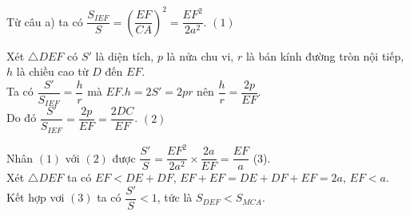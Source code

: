 \begin{bt}
{\begin{itemize}
			Từ câu a) ta có $\dfrac{S_{IEF}}{S}=(\dfrac{EF}{CA})^2=\dfrac{EF^2}{2a^2}$. \hspace{\fill} $(1)$\smallskip
			
			Xét $\triangle DEF$ có $S'$ là diện tích, $p$ là nửa chu vi, $r$ là bán kính đường tròn nội tiếp, $h$ là chiều cao từ $D$ đến $EF$.\\
			Ta có $\dfrac{S'}{S_{IEF}}=\dfrac{h}{r}$ mà $EF.h=2S'=2pr$ nên $\dfrac{h}{r}=\dfrac{2p}{EF}$.\\
			Do đó $\dfrac{S'}{S_{IEF}}=\dfrac{2p}{EF}=\dfrac{2DC}{EF}$. \hspace{\fill} $(2)$\smallskip
			
			Nhân $(1)$ với $(2)$ được $\dfrac{S'}{S}=\dfrac{EF^2}{2a^2}\times \dfrac{2a}{EF}=\dfrac{EF}{a}$ \hspace{\fill} (3).\\
			Xét $\triangle DEF$ ta có $EF<DE+DF$, $EF+EF=DE+DF+EF=2a$, $EF<a$.\\
			Kết hợp vơi $(3)$ ta có $ \dfrac{S'}{S}<1$, tức là $S_{DEF}<S_{MCA}$.
		\end{itemize}
		
	}
\end{bt}

